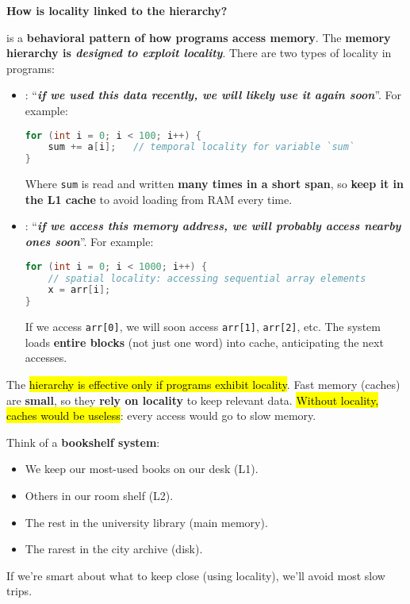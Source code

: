 \highspace
\begin{flushleft}
    \textcolor{Green3}{ \textbf{How is locality linked to the hierarchy?}}
\end{flushleft}
 is a \textbf{behavioral pattern of how programs access memory}. The \textbf{memory hierarchy is \emph{designed to exploit locality}}. There are two types of locality in programs:
\begin{itemize}
    \item {}: ``\emph{\textbf{if we used this data recently, we will likely use it again soon}}''. For example:
    \begin{lstlisting}[language=c]
for (int i = 0; i < 100; i++) {
    sum += a[i];   // temporal locality for variable `sum`
}\end{lstlisting}
    Where \texttt{sum} is read and written \textbf{many times in a short span}, so \textbf{keep it in the L1 cache} to avoid loading from RAM every time.

    \item \label{def: Spatial Locality} : ``\emph{\textbf{if we access this memory address, we will probably access nearby ones soon}}''. For example:
    \begin{lstlisting}[language=c]
for (int i = 0; i < 1000; i++) {
    // spatial locality: accessing sequential array elements
    x = arr[i];
}\end{lstlisting}
    If we access \texttt{arr[0]}, we will soon access \texttt{arr[1]}, \texttt{arr[2]}, etc. The system loads \textbf{entire blocks} (not just one word) into cache, anticipating the next accesses.
\end{itemize}
The \hl{hierarchy is effective only if programs exhibit locality}. Fast memory (caches) are \textbf{small}, so they \textbf{rely on locality} to keep relevant data. \hl{Without locality, caches would be useless}: every access would go to slow memory.

\begin{examplebox}
    Think of a \textbf{bookshelf system}:
    \begin{itemize}
        \item We keep our most-used books on our desk (L1).
        \item Others in our room shelf (L2).
        \item The rest in the university library (main memory).
        \item The rarest in the city archive (disk).
    \end{itemize}
    If we're smart about what to keep close (using locality), we'll avoid most slow trips.
\end{examplebox}